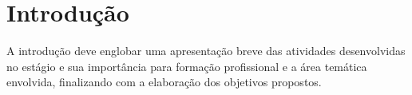 \chapter[Introdução]{Introdução}

A introdução deve englobar uma apresentação breve das atividades desenvolvidas no estágio e sua 
importância para formação profissional e a área temática envolvida, finalizando com a elaboração 
dos objetivos propostos.